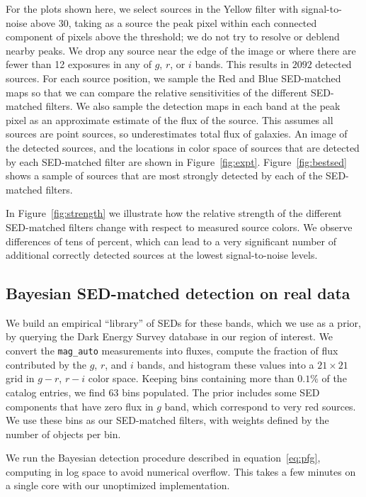 \documentclass[11pt,letterpaper,linenumbers]{aastex7}
\newcommand{\equationname}{equation}
\newcommand{\eqnref}[1]{\mbox{\equationname~\ref{#1}}}
\newcommand{\figref}[1]{\mbox{Figure~\ref{#1}}}
\newcommand{\changed}[1]{#1}
\begin{document}
For the plots shown here, we select sources in the Yellow filter with
signal-to-noise above $30$, taking as a source the peak pixel within
each connected component of pixels above the threshold; we do not try
to resolve or deblend nearby peaks.  We drop any source near the edge
of the image or where there are fewer than 12 exposures in any of $g$,
$r$, or $i$ bands.  This results in $2092$ detected sources.  For each
source position, we sample the Red and Blue SED-matched maps so that
we can compare the relative sensitivities of the different SED-matched
filters.  We also sample the detection maps in each band at the peak
pixel as an approximate estimate of the flux of the source.  This
assumes all sources are point sources, so underestimates total flux of
galaxies.  An image of the detected sources, and the locations in
color space of sources that are detected by each SED-matched filter
are shown in \figref{fig:expt}.  \figref{fig:bestsed} shows a sample
of sources that are most strongly detected by each of the SED-matched
filters.


In \figref{fig:strength} we illustrate how the relative strength of
the different SED-matched filters change with respect to measured
source colors.  We observe differences of tens of percent, which can
lead to a very significant number of additional correctly detected sources at
the lowest signal-to-noise levels.

\subsection{Bayesian SED-matched detection on real data}

We build an empirical ``library'' of SEDs for these bands, which we
use as a prior, by querying the Dark Energy Survey database in our
region of interest.  We convert the \texttt{mag\_auto} measurements
into fluxes, compute the fraction of flux contributed by the $g$, $r$,
and $i$ bands, and histogram these values into a $21 \times 21$ grid in
$g-r$, $r-i$ color space.
Keeping bins containing more than $0.1 \%$ of the catalog entries, we
find 63 bins populated.  The prior
includes some SED components that have zero flux in $g$ band, which
correspond to very red sources.  \changed{We use these bins as our SED-matched
filters, with weights defined by the number of objects per bin.
}

We run the Bayesian detection procedure described in
\eqnref{eq:pfg}, computing in log space to avoid numerical overflow.
This takes a few minutes on a single core with our unoptimized
implementation.
\end{document}

